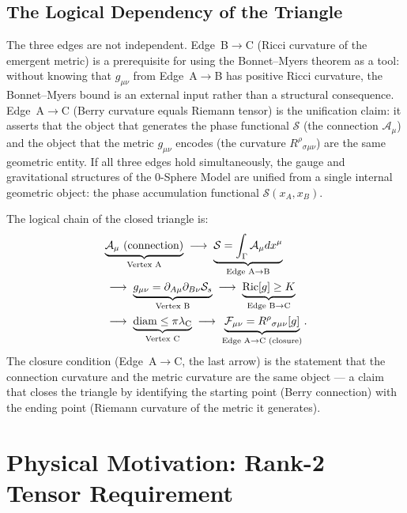 \documentclass[%
 reprint, amsmath,amssymb, aps, prd, ]{revtex4-2}
\numberwithin{equation}{section}
\newcommand{\lambdaC}{\lambda_{\mathrm{C}}}
\newcommand{\BerryA}{\mathcal{A}}
\newcommand{\BerryF}{\mathcal{F}}
\newcommand{\SyngeS}{\mathcal{S}}
\begin{document}
\subsection{The Logical Dependency of the Triangle}

The three edges are not independent.
Edge~B$\to$C (Ricci curvature of the emergent metric) is a prerequisite for using the Bonnet--Myers theorem as a tool: without knowing that $g_{\mu\nu}$ from Edge~A$\to$B has positive Ricci curvature, the Bonnet--Myers bound is an external input rather than a structural consequence.
Edge~A$\to$C (Berry curvature equals Riemann tensor) is the unification claim: it asserts that the object that generates the phase functional $\SyngeS$ (the connection $\BerryA_\mu$) and the object that the metric $g_{\mu\nu}$ encodes (the curvature $R^\rho{}_{\sigma\mu\nu}$) are the same geometric entity.
If all three edges hold simultaneously, the gauge and gravitational structures of the 0-Sphere Model are unified from a single internal geometric object: the phase accumulation functional $\SyngeS(x_A,x_B)$.

The logical chain of the closed triangle is:
\begin{align}
&\underbrace{\BerryA_\mu \text{ (connection)}}_{\text{Vertex A}}
\;\longrightarrow\;
\underbrace{\SyngeS = \int_{\Gamma} \BerryA_\mu dx^\mu}_{\text{Edge A$\to$B}}
\notag\\
&\;\longrightarrow\;
\underbrace{g_{\mu\nu} = \partial_{A\mu}\partial_{B\nu}\SyngeS_s}_{\text{Vertex B}}
\;\longrightarrow\;
\underbrace{\mathrm{Ric}[g] \geq K}_{\text{Edge B$\to$C}}
\notag\\
&\;\longrightarrow\;
\underbrace{\mathrm{diam} \leq \pi\lambdaC}_{\text{Vertex C}}
\;\longrightarrow\;
\underbrace{\BerryF_{\mu\nu} = R^\rho{}_{\sigma\mu\nu}[g]}_{\text{Edge A$\to$C (closure)}}.
\label{eq:triangle_chain}
\end{align}
The closure condition (Edge~A$\to$C, the last arrow) is the statement that the connection curvature and the metric curvature are the same object --- a claim that closes the triangle by identifying the starting point (Berry connection) with the ending point (Riemann curvature of the metric it generates).

\section{Physical Motivation: Rank-2 Tensor Requirement}
\label{sec:physical}
\end{document}
